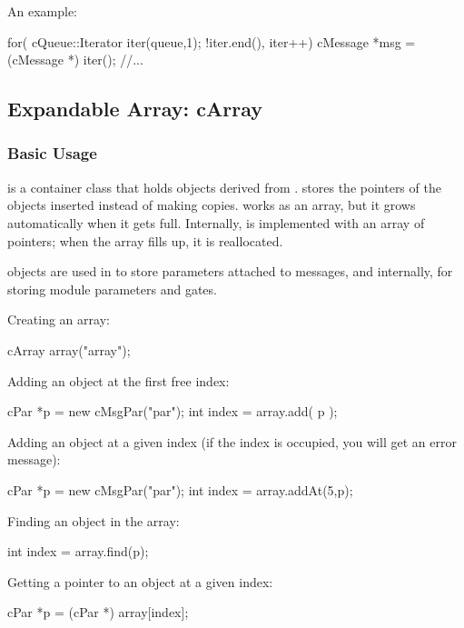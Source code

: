 An example:

\begin{cpp}
for( cQueue::Iterator iter(queue,1); !iter.end(), iter++)
{
  cMessage *msg = (cMessage *) iter();
  //...
}
\end{cpp}




\subsection{Expandable Array: cArray}

\subsubsection{Basic Usage}


 is a container class that holds objects derived from
.  stores the pointers of the objects
inserted instead of making copies.  works as an array,
but it grows automatically when it gets full. Internally,
 is implemented with an array of pointers; when the array
fills up, it is reallocated.

 objects are used in {\opp} to store parameters
attached to messages, and internally, for storing module parameters
and gates.


Creating an array:

\begin{cpp}
cArray array("array");
\end{cpp}

Adding an object at the first free index:

\begin{cpp}
cPar *p = new cMsgPar("par");
int index = array.add( p );
\end{cpp}


Adding an object at a given index (if the index is occupied,
you will get an error message):

\begin{cpp}
cPar *p = new cMsgPar("par");
int index = array.addAt(5,p);
\end{cpp}


Finding an object in the array:

\begin{cpp}
int index = array.find(p);
\end{cpp}

Getting a pointer to an object at a given index:

\begin{cpp}
cPar *p = (cPar *) array[index];
\end{cpp}

